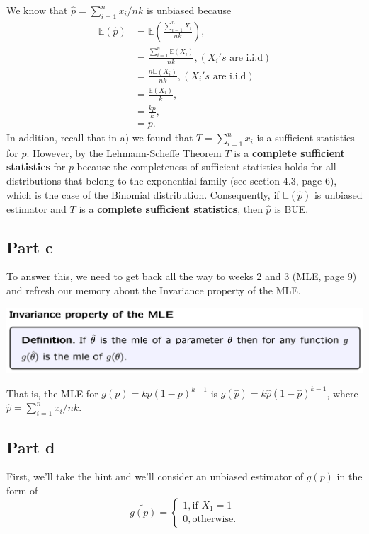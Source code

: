 \documentclass[12pt]{article}
\begin{document}
We know that $\hat{p} = \sum_{i=1}^{n}x_{i}/nk$ is unbiased because
\begin{align}
\mathbb{E}(\hat{p}) & = \mathbb{E}\left(\frac{\sum_{i=1}^{n}X_{i}}{nk}\right), \\
& = \frac{\sum_{i=1}^{n} \mathbb{E}(X_{i}) }{nk} , (X_{i}'s \mbox{ are i.i.d})\\
& = \frac{n \mathbb{E}(X_{i}) }{nk} , (X_{i}'s \mbox{ are i.i.d}) \\
& = \frac{\mathbb{E}(X_{i}) }{k} , \\
& = \frac{kp}{k}, \\
& = p.
\end{align}
In addition, recall that in a) we found that $T = \sum_{i=1}^{n}x_{i}$ is a sufficient statistics for $p$. However, by the Lehmann-Scheffe Theorem $T$ is a \textbf{complete sufficient statistics} for $p$ because the completeness of sufficient statistics holds for all distributions that belong to the exponential family (see section 4.3, page 6), which is the case of the Binomial distribution. Consequently, if $\mathbb{E}(\hat{p})$ is unbiased estimator and $T$ is a \textbf{complete sufficient statistics}, then $\hat{p}$ is BUE.

\subsection*{Part c}

To answer this, we need to get back all the way to weeks 2 and 3 (MLE, page 9) and refresh our memory about the Invariance property of the MLE.

\includegraphics[width=1\linewidth]{invariance.png}

That is, the MLE for $g(p) = kp(1-p)^{k-1}$ is $g(\hat{p}) = k\hat{p}(1-\hat{p})^{k-1}$, where $\hat{p} = \sum_{i=1}^{n}x_{i}/nk$.

\subsection*{Part d}

First, we'll take the hint and we'll consider an unbiased estimator of $g(p)$ in the form of
\begin{equation} \tilde{g(p)} = 
    \begin{cases}
      1, \mbox{if } X_{1} = 1 \\
      0, \mbox{otherwise}. 
    \end{cases}
\end{equation}
\end{document}
